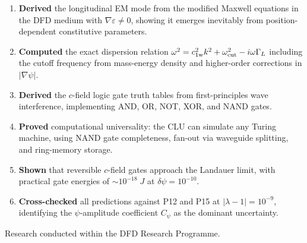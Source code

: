 \documentclass[aps,prd,twocolumn,superscriptaddress,nofootinbib,floatfix]{revtex4-2}
\newcommand{\cfield}{c_{\text{1w}}}
\begin{document}
\begin{enumerate}
\item \textbf{Derived} the longitudinal EM mode from the modified
Maxwell equations in the DFD medium with $\nabla\varepsilon \neq 0$,
showing it emerges inevitably from position-dependent constitutive
parameters.

\item \textbf{Computed} the exact dispersion relation
$\omega^2 = \cfield^2 k^2 + \omega_{\rm cut}^2 - i\omega\Gamma_L$
including the cutoff frequency from mass-energy density and
higher-order corrections in $|\nabla\psi|$.

\item \textbf{Derived} the $c$-field logic gate truth tables from
first-principles wave interference, implementing AND, OR, NOT,
XOR, and NAND gates.

\item \textbf{Proved} computational universality: the CLU can simulate
any Turing machine, using NAND gate completeness, fan-out via
waveguide splitting, and ring-memory storage.

\item \textbf{Shown} that reversible $c$-field gates approach the
Landauer limit, with practical gate energies of $\sim 10^{-18}\;\si{J}$
at $\delta\psi = 10^{-10}$.

\item \textbf{Cross-checked} all predictions against P12 and P15 at
$|\lambda-1| = 10^{-9}$, identifying the $\psi$-amplitude coefficient
$C_\psi$ as the dominant uncertainty.
\end{enumerate}

\begin{acknowledgments}
Research conducted within the DFD Research Programme.
\end{acknowledgments}
\end{document}
